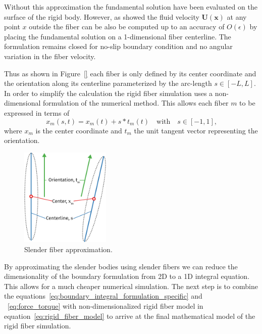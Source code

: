 \documentclass[a4paper,11pt]{kth-mag}
\begin{document}
Without this approximation the fundamental solution have been evaluated on the surface of the rigid body. However, as \cite{} showed the fluid velocity $\mathbf{U}(\mathbf{x})$ at any point $x$ outside the fiber can be also be computed up to an accuracy of $O(\epsilon)$ by placing the fundamental solution on a 1-dimensional fiber centerline. The formulation remains closed for no-slip boundary condition and no angular variation in the fiber velocity.

Thus as shown in Figure~\ref{} each fiber is only defined by its center coordinate and the orientation along its centerline parameterized by the arc-length $s \in [-L, L]$. In order to simplify the calculation the rigid fiber simulation uses a non-dimensional formulation of the numerical method. This allows each fiber $m$ to be expressed in terms of
\begin{equation}
  \label{eq:rigid_fiber_model}
  x_m(s,t) = x_m(t) + s * t_m(t) \quad \text{with} \quad s \in [-1, 1] \text{,}
\end{equation}
where $x_m$ is the center coordinate and $t_m$ the unit tangent vector representing the orientation.

\begin{figure}[!htbp]
  \centering
  \includegraphics[width=0.3819660112501450000000\textwidth]{img/slender.pdf}
  \caption{Slender fiber approximation.}
  \label{fig:slender_fiber}
\end{figure}

By approximating the slender bodies using slender fibers we can reduce the dimensionality of the boundary formulation from 2D to a 1D integral equation. This allows for a much cheaper numerical simulation. The next step is to combine the equations~\eqref{eq:boundary_integral_formulation_specific} and ~\eqref{eq:force_torque} with non-dimensionalized rigid fiber model in equation~\eqref{eq:rigid_fiber_model} to arrive at the final mathematical model of the rigid fiber simulation.
\end{document}
